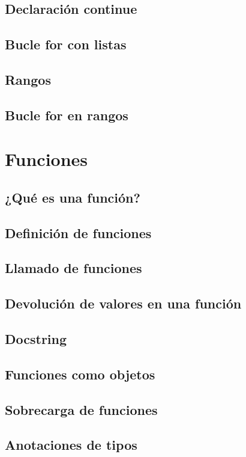 \documentclass{article}
\begin{document}
      \subsection{Declaración continue}
      \subsection{Bucle for con listas}
      \subsection{Rangos}
      \subsection{Bucle for en rangos}
    
    \section{Funciones}

      \subsection{¿Qué es una función?}
      \subsection{Definición de funciones}
      \subsection{Llamado de funciones}
      \subsection{Devolución de valores en una función}
      \subsection{Docstring}
      \subsection{Funciones como objetos}
      \subsection{Sobrecarga de funciones}
      \subsection{Anotaciones de tipos}
    
\end{document}
